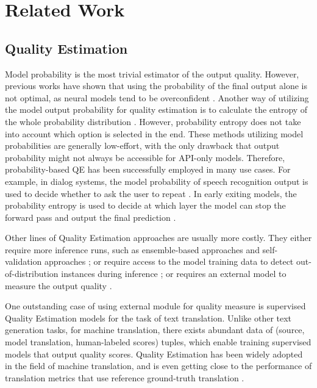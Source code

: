 \section{Related Work}
\subsection{Quality Estimation} 
Model probability is the most trivial estimator of the output quality. However, previous works have shown that using the probability of the final output alone is not optimal, as neural models tend to be overconfident \cite{nguyen2015deep,li2021confidence}. Another way of utilizing the model output probability for quality estimation is to calculate the entropy of the whole probability distribution \cite{fomicheva-etal-2020-unsupervised}. However, probability entropy does not take into account which option is selected in the end. These methods utilizing model probabilities are generally low-effort, with the only drawback that output probability might not always be accessible for API-only models. Therefore, probability-based QE has been successfully employed in many use cases. For example, in dialog systems, the model probability of speech recognition output is used to decide whether to ask the user to repeat \cite{jm3}. In early exiting models, the probability entropy is used to decide at which layer the model can stop the forward pass and output the final prediction \cite{teerapittayanon2016branchynet, xin-etal-2020-deebert}.

Other lines of Quality Estimation approaches are usually more costly. They either require more inference runs, such as ensemble-based approaches \cite{kuhn2023semantic, malinin2020uncertainty} and self-validation approaches \cite{kadavath2022language}; or require access to the model training data to detect out-of-distribution instances during inference \cite{NEURIPS2018_abdeb6f5, ren2023outofdistribution}; or requires an external model to measure the output quality \cite{rei-etal-2022-cometkiwi,cohen-etal-2023-lm}.

One outstanding case of using external module for quality measure is supervised Quality Estimation models for the task of text translation. Unlike other text generation tasks, for machine translation, there exists abundant data of (source, model translation, human-labeled scores) tuples, which enable training supervised models that output quality scores. Quality Estimation has been widely adopted in the field of machine translation, and is even getting close to the performance of translation metrics that use reference ground-truth translation \cite{freitag-etal-2022-results}.

